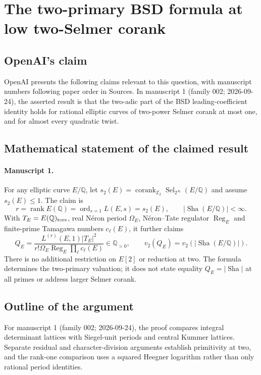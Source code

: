 \documentclass[11pt]{article}
\begin{document}
\section*{The two-primary BSD formula at low two-Selmer corank}

\subsection{OpenAI's claim}
OpenAI presents the following claims relevant to this question, with manuscript numbers following paper order in Sources. In manuscript 1 (family 002; 2026-09-24), the asserted result is that the two-adic part of the BSD leading-coefficient identity holds for rational elliptic curves of two-power Selmer corank at most one, and for almost every quadratic twist.

\subsection{Mathematical statement of the claimed result}
\paragraph{Manuscript 1.}
For any elliptic curve $E/\mathbb Q$, let $s_2(E)=\operatorname{corank}_{\mathbb Z_2}\operatorname{Sel}_{2^{\infty}}(E/\mathbb Q)$ and assume $s_2(E)\le1$. The claim is
\[
 r=\operatorname{rank}E(\mathbb Q)=\operatorname{ord}_{s=1}L(E,s)=s_2(E),
 \qquad |\operatorname{Sha}(E/\mathbb Q)|<\infty.
\]
With $T_E=E(\mathbb Q)_{\rm tors}$, real N\'eron period $\Omega_E$, N\'eron--Tate regulator $\operatorname{Reg}_E$ and finite-prime Tamagawa numbers $c_{\ell}(E)$, it further claims
\[
 Q_E=\frac{L^{(r)}(E,1)|T_E|^2}{r!\Omega_E\operatorname{Reg}_E\prod_{\ell} c_{\ell}(E)}
 \in\mathbb Q_{>0},\qquad v_2(Q_E)=v_2(|\operatorname{Sha}(E/\mathbb Q)|).
\]
There is no additional restriction on $E[2]$ or reduction at two. The formula determines the two-primary valuation; it does not state equality $Q_E=|\operatorname{Sha}|$ at all primes or address larger Selmer corank.

\subsection{Outline of the argument}
For manuscript 1 (family 002; 2026-09-24), the proof compares integral determinant lattices with Siegel-unit periods and central Kummer lattices. Separate residual and character-division arguments establish primitivity at two, and the rank-one comparison uses a squared Heegner logarithm rather than only rational period identities.
\end{document}
